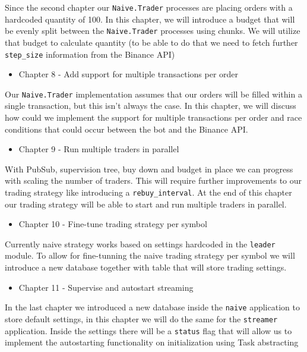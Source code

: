 \documentclass[
]{book}
\providecommand{\tightlist}{%
  \setlength{\itemsep}{0pt}\setlength{\parskip}{0pt}}
\begin{document}
Since the second chapter our \texttt{Naive.Trader} processes are placing orders with a hardcoded quantity of 100. In this chapter, we will introduce a budget that will be evenly split between the \texttt{Naive.Trader} processes using chunks. We will utilize that budget to calculate quantity (to be able to do that we need to fetch further \texttt{step\_size} information from the Binance API)

\begin{itemize}
\tightlist
\item
  Chapter 8 - Add support for multiple transactions per order
\end{itemize}

Our \texttt{Naive.Trader} implementation assumes that our orders will be filled within a single transaction, but this isn't always the case. In this chapter, we will discuss how could we implement the support for multiple transactions per order and race conditions that could occur between the bot and the Binance API.

\begin{itemize}
\tightlist
\item
  Chapter 9 - Run multiple traders in parallel
\end{itemize}

With PubSub, supervision tree, buy down and budget in place we can progress with scaling the number of traders. This will require further improvements to our trading strategy like introducing a \texttt{rebuy\_interval}. At the end of this chapter our trading strategy will be able to start and run multiple traders in parallel.

\begin{itemize}
\tightlist
\item
  Chapter 10 - Fine-tune trading strategy per symbol
\end{itemize}

Currently naive strategy works based on settings hardcoded in the \texttt{leader} module. To allow for fine-tunning the naive trading strategy per symbol we will introduce a new database together with table that will store trading settings.

\begin{itemize}
\tightlist
\item
  Chapter 11 - Supervise and autostart streaming
\end{itemize}

In the last chapter we introduced a new database inside the \texttt{naive} application to store default settings, in this chapter we will do the same for the \texttt{streamer} application. Inside the settings there will be a \texttt{status} flag that will allow us to implement the autostarting functionality on initialization using Task abstracting
\end{document}
